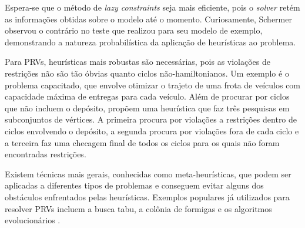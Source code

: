 Espera-se que o método de \emph{lazy constraints} seja mais eficiente, pois o \emph{solver} retém as informações obtidas sobre o modelo até o momento. Curiosamente, Schermer observou o contrário no teste que realizou para seu modelo de exemplo, demonstrando a natureza probabilística da aplicação de heurísticas ao problema.

Para PRVs, heurísticas mais robustas são necessárias, pois as violações de restrições não são tão óbvias quanto ciclos não-hamiltonianos. Um exemplo é o problema capacitado, que envolve otimizar o trajeto de uma frota de veículos com capacidade máxima de entregas para cada veículo. Além de procurar por ciclos que não incluem o depósito, \textcite{ACHUTHAN:96} propõem uma heurística que faz três pesquisas em subconjuntos de vértices. A primeira procura por violações a restrições dentro de ciclos envolvendo o depósito, a segunda procura por violações fora de cada ciclo e a terceira faz uma checagem final de todos os ciclos para os quais não foram encontradas restrições.



Existem técnicas mais gerais, conhecidas como meta-heurísticas, que podem ser aplicadas a diferentes tipos de problemas e conseguem evitar alguns dos obstáculos enfrentados pelas heurísticas. Exemplos populares já utilizados para resolver PRVs incluem a busca tabu, a colônia de formigas e os algoritmos evolucionários \cite{VIEIRA:13}.

